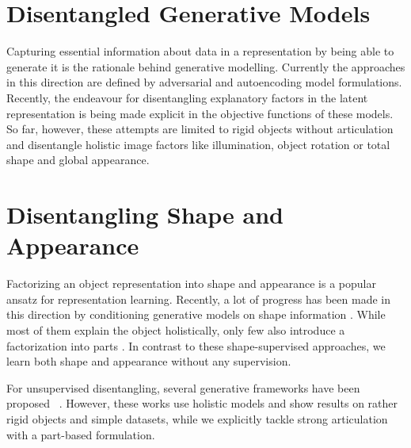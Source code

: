\section{Disentangled Generative Models}
	Capturing essential information about data in a representation by being able to generate it is the rationale behind generative modelling. Currently the approaches in this direction are defined by adversarial \cite{Goodfellow:2014td} and autoencoding \cite{Kingma:2013tz} model formulations. Recently, the endeavour for disentangling explanatory factors in the latent representation is being made explicit in the objective functions \cite{Burgess:2018uf, Chen:2016tp} of these models. So far, however, these attempts are limited to rigid objects without articulation and disentangle holistic image factors like illumination, object rotation or total shape and global appearance.  \ %

\section{Disentangling Shape and Appearance}
	Factorizing an object representation into shape and appearance is a popular ansatz for representation learning.
	Recently, a lot of progress has been made in this direction by conditioning generative models on shape information \cite{Esser:2018ue, Ma:2017wq, deBem:2018wp, Ma:2017uu, Siarohin:2018wk, Balakrishnan:2018wo}.
	While most of them explain the object holistically, only few also introduce a factorization into parts \cite{Siarohin:2018wk, Balakrishnan:2018wo}.
	In contrast to these shape-supervised approaches, we learn both shape and appearance without any supervision.

	For unsupervised disentangling, several generative frameworks have been proposed ~\cite{Higgins2016betavae, Chen2016infogan, Li2018analogy, Denton:2017uf, Shu:2018ua, Xing:2018un}.
	However, these works use holistic models and show results on rather rigid objects and simple datasets, while we explicitly tackle strong articulation with a part-based formulation.

